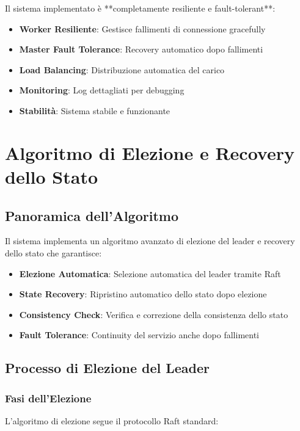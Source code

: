 \documentclass[12pt,a4paper]{article}
\begin{document}
Il sistema implementato è **completamente resiliente e fault-tolerant**:

\begin{itemize}
\item \textbf{Worker Resiliente}: Gestisce fallimenti di connessione gracefully
\item \textbf{Master Fault Tolerance}: Recovery automatico dopo fallimenti
\item \textbf{Load Balancing}: Distribuzione automatica del carico
\item \textbf{Monitoring}: Log dettagliati per debugging
\item \textbf{Stabilità}: Sistema stabile e funzionante
\end{itemize}

\section{Algoritmo di Elezione e Recovery dello Stato}

\subsection{Panoramica dell'Algoritmo}

Il sistema implementa un algoritmo avanzato di elezione del leader e recovery dello stato che garantisce:

\begin{itemize}
\item \textbf{Elezione Automatica}: Selezione automatica del leader tramite Raft
\item \textbf{State Recovery}: Ripristino automatico dello stato dopo elezione
\item \textbf{Consistency Check}: Verifica e correzione della consistenza dello stato
\item \textbf{Fault Tolerance}: Continuity del servizio anche dopo fallimenti
\end{itemize}

\subsection{Processo di Elezione del Leader}

\subsubsection{Fasi dell'Elezione}

L'algoritmo di elezione segue il protocollo Raft standard:
\end{document}
